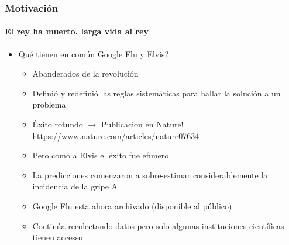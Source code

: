 \documentclass[
  shownotes,
  xcolor={svgnames},
  hyperref={colorlinks,citecolor=DarkBlue,linkcolor=DarkRed,urlcolor=DarkBlue}
  , aspectratio=169]{beamer}
\begin{document}
\begin{frame}
\frametitle{Motivación}
\framesubtitle{El rey ha muerto, larga vida al rey}
  \begin{itemize}
    \item Qué tienen en común Google Flu y Elvis?
    \bigskip
    \begin{itemize}
      \item Abanderados de la revolución
      \medskip
      \item Definió y redefinió las reglas sistemáticas para hallar la solución a un problema
      \medskip
      \item Éxito rotundo $\rightarrow$ Publicacion en Nature! \url{https://www.nature.com/articles/nature07634}
      \medskip
      \item Pero como a Elvis el éxito fue efímero
      \medskip
      \item La predicciones comenzaron a sobre-estimar considerablemente la incidencia de la gripe A
      \medskip
      \item Google Flu esta ahora archivado (disponible al público)
      \medskip
      \item Continúa recolectando datos pero solo algunas instituciones científicas tienen accesso 
    \end{itemize}  
  \end{itemize}  
\end{frame}
\end{document}
